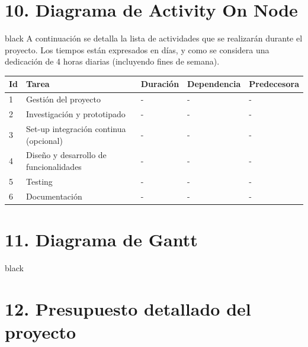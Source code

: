 \documentclass[
11pt, %
]{charter}
\begin{document}
\section{10. Diagrama de Activity On Node}
\label{sec:AoN}

\begin{consigna}{black}
A continuación se detalla la lista de actividades que se realizarán durante el proyecto. Los tiempos están expresados en días, y como se considera una dedicación de 4 horas diarias (incluyendo fines de semana). 

\begin{table}[ht]
\begin{tabularx}{\linewidth}{@{}|l|X|l|l|l|@{}}
\hline
\rowcolor[HTML]{C0C0C0} 
Id	& Tarea           									& Duración 			& Dependencia	& Predecesora 	\\ \hline
1	& Gestión del proyecto 								& -		& -				&  - 		\\ \hline
2	& Investigación y prototipado						& -		& -				&  -      		\\ \hline
3	& Set-up integración continua (opcional)			& -   	& -        		&  -			\\ \hline
4	& Diseño y desarrollo de funcionalidades    		& -		& -			 	& -			\\ \hline
5	& Testing								    		& -		& -				& -			\\ \hline
6	& Documentación    									& -		& -			 	& -				\\ \hline

\end{tabularx}
\end{table}

\end{consigna}


\section{11. Diagrama de Gantt}
\label{sec:gantt}

\begin{consigna}{black}


\end{consigna}

\section{12. Presupuesto detallado del proyecto}
\label{sec:presupuesto}
\end{document}
